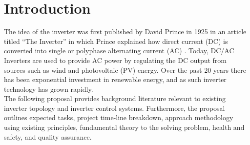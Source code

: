 \chapter{Introduction}
The idea of the inverter was first published by David Prince in 1925 in an article titled ``The Inverter'' in which Prince explained how direct current (DC) is converted into single or polyphase alternating current (AC) . Today, DC/AC Inverters are used to provide AC power by regulating the DC output from sources such as wind and photovoltaic (PV) energy. Over the past 20 years there has been exponential investment in renewable energy, and as such inverter technology has grown rapidly\cite{476602}.\\
The following proposal provides background literature relevant to existing inverter topology and inverter control systems. Furthermore, the proposal outlines expected tasks, project time-line breakdown, approach methodology using existing principles, fundamental theory to the solving problem, health and safety, and quality assurance.